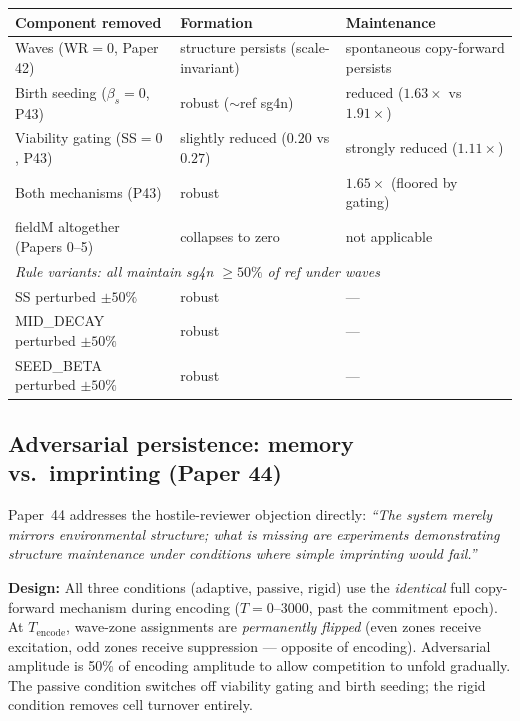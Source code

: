 \documentclass[11pt]{article}
\begin{document}
\begin{center}
\begin{tabular}{lll}
\toprule
\textbf{Component removed} & \textbf{Formation} & \textbf{Maintenance} \\
\midrule
Waves (WR$=0$, Paper 42)          & structure persists (scale-invariant) & spontaneous copy-forward persists \\
Birth seeding ($\beta_s{=}0$, P43) & robust ($\sim$ref sg4n)             & reduced ($1.63\times$ vs $1.91\times$) \\
Viability gating (SS$=0$, P43)    & slightly reduced ($0.20$ vs $0.27$) & strongly reduced ($1.11\times$) \\
Both mechanisms (P43)             & robust                               & $1.65\times$ (floored by gating) \\
fieldM altogether (Papers 0--5)   & collapses to zero                   & not applicable \\
\midrule
\multicolumn{3}{l}{\textit{Rule variants: all maintain sg4n $\geq 50\%$ of ref under waves}}\\
SS perturbed $\pm50\%$        & robust & --- \\
MID\_DECAY perturbed $\pm50\%$ & robust & --- \\
SEED\_BETA perturbed $\pm50\%$ & robust & --- \\
\bottomrule
\end{tabular}
\end{center}

\subsection{Adversarial persistence: memory vs.\ imprinting (Paper 44)}

Paper~44 addresses the hostile-reviewer objection directly:
\emph{``The system merely mirrors environmental structure; what is missing are experiments
demonstrating structure maintenance under conditions where simple imprinting would fail.''}

\textbf{Design:} All three conditions (adaptive, passive, rigid) use the \emph{identical}
full copy-forward mechanism during encoding ($T = 0$--$3000$, past the commitment epoch).
At $T_\mathrm{encode}$, wave-zone assignments are \emph{permanently flipped} (even zones
receive excitation, odd zones receive suppression --- opposite of encoding).
Adversarial amplitude is 50\% of encoding amplitude to allow competition to unfold gradually.
The passive condition switches off viability gating and birth seeding;
the rigid condition removes cell turnover entirely.
\end{document}
